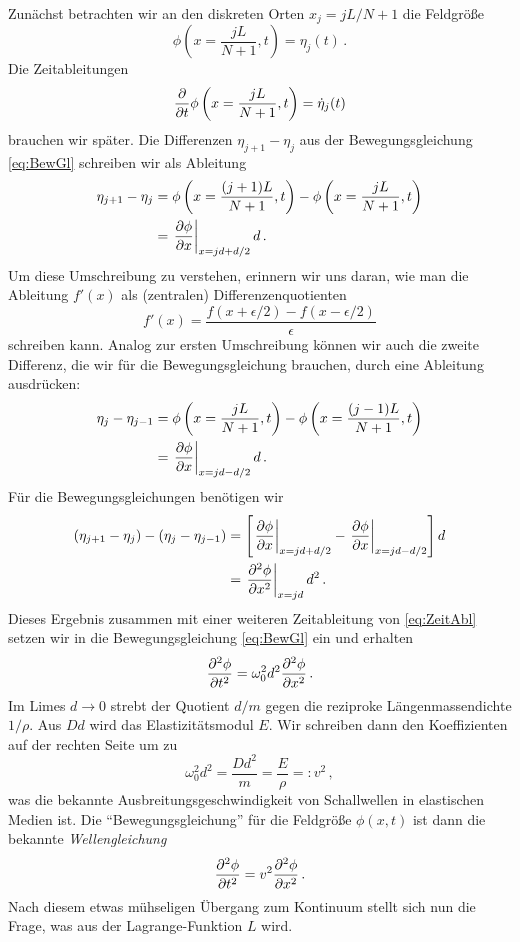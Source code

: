 \documentclass[paper=a4, fontsize=11.0pt, abstractoff, DIV12]{scrartcl}
\begin{document}
Zunächst betrachten wir an den diskreten Orten $x_j = jL/N+1$ die Feldgröße
\begin{equation}
\phi\left(x=\frac{jL}{N+1}, t\right) = \eta_j(t)\,.
\end{equation}
Die Zeitableitungen
\begin{equation}
\frac{\partial }{\partial t}\phi\left(x=\frac{jL}{N+1}, t\right) = \dot\eta_j(t)
\label{eq:ZeitAbl}
\end{equation}
brauchen wir später. Die Differenzen $\eta_{j+1}-\eta_j$ aus der
Bewegungsgleichung \eqref{eq:BewGl} schreiben wir als Ableitung
\begin{align}
\eta_{j+1}-\eta_j &=\phi\left(x=\frac{(j+1)L}{N+1}, t\right) - \phi\left(x=\frac{jL}{N+1}, t\right)\nonumber\\
&=\left.\frac{\partial \phi}{\partial x}\right\vert_{x=jd+d/2}d\,.
\end{align}
Um diese Umschreibung zu verstehen, erinnern wir uns daran, wie man die
Ableitung $f'(x)$ als (zentralen) Differenzenquotienten
\begin{equation*}
f'(x) = \frac{f(x+\epsilon/2) - f(x-\epsilon/2)}{\epsilon}
\end{equation*}
schreiben kann. Analog zur ersten Umschreibung können wir auch die zweite
Differenz, die wir für die Bewegungsgleichung brauchen, durch eine Ableitung
ausdrücken:
\begin{align}
\eta_{j}-\eta_{j-1} &= \phi\left(x=\frac{jL}{N+1}, t\right) - \phi\left(x=\frac{(j-1)L}{N+1}, t\right)\nonumber\\
&=\left.\frac{\partial \phi}{\partial x}\right\vert_{x=jd-d/2}d\,.
\end{align}
Für die Bewegungsgleichungen benötigen wir
\begin{align}
(\eta_{j+1} - \eta_j) - (\eta_j-\eta_{j-1}) &= \left[\left.\frac{\partial \phi}{\partial x}\right\vert_{x=jd+d/2} - \left.\frac{\partial \phi}{\partial x}\right\vert_{x=jd-d/2}\right]d\nonumber\\
&=\left.\frac{\partial^2 \phi}{\partial {x}^2}\right\vert_{x=jd} d^2\,.
\end{align}
Dieses Ergebnis zusammen mit einer weiteren Zeitableitung von
\eqref{eq:ZeitAbl} setzen wir in die Bewegungsgleichung \eqref{eq:BewGl} ein
und erhalten
\begin{equation}
\frac{\partial^2 \phi}{\partial {t}^2} = \omega_0^2d^2\frac{\partial^2 \phi}{\partial {x}^2}\,.
\end{equation}
Im Limes $d \to 0$ strebt der Quotient $d/m$ gegen die reziproke
Längenmassendichte $1/\rho$. Aus $Dd$ wird das Elastizitätsmodul $E$. Wir
schreiben dann den Koeffizienten auf der rechten Seite um zu
\begin{equation}
\omega_0^2d^2 = \frac{Dd^2}{m} = \frac{E}{\rho} =: v^2\,,
\end{equation}
was die bekannte Ausbreitungsgeschwindigkeit von Schallwellen in elastischen
Medien ist. Die ``Bewegungsgleichung'' für die Feldgröße $\phi(x,t)$ ist dann
die bekannte \emph{Wellengleichung}
\begin{equation}
\frac{\partial^2 \phi}{\partial {t}^2} = v^2\frac{\partial^2 \phi}{\partial {x}^2}\,.
\label{eq:Wellengleichung}
\end{equation}
Nach diesem etwas mühseligen Übergang zum Kontinuum stellt sich nun die Frage,
was aus der Lagrange-Funktion $L$ wird.
\end{document}
